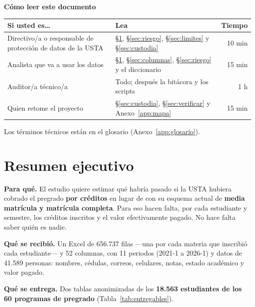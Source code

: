 \documentclass[11pt,a4paper,twoside,twocolumn]{article}
\newcommand{\cab}[1]{\textcolor{ustaAzul}{\textbf{#1}}}
\begin{document}
\begin{nota}
{\normalsize\bfseries\color{ustaAzul} Cómo leer este documento}\par\smallskip
\footnotesize
\setlength{\tabcolsep}{3pt}
\begin{tabularx}{\linewidth}{@{}L P{2.3cm} r@{}}
\toprule
\cab{Si usted es\ldots} & \cab{Lea} & \cab{Tiempo} \\
\midrule
Directivo/a o responsable de protección de datos de la USTA & §\ref{sec:resumen}, §\ref{sec:riesgo}, §\ref{sec:limites} y §\ref{sec:custodia} & 10 min \\
Analista que va a usar los datos & §\ref{sec:resumen}, §\ref{sec:columnas}, §\ref{sec:riesgo} y el diccionario & 15 min \\
Auditor/a técnico/a & Todo; después la bitácora y los scripts & 1 h \\
Quien retome el proyecto & §\ref{sec:custodia}, §\ref{sec:verificar} y Anexo~\ref{app:mapa} & 15 min \\
\bottomrule
\end{tabularx}
\par\smallskip
Los términos técnicos están en el glosario (Anexo~\ref{app:glosario}).
\end{nota}

\section{Resumen ejecutivo}\label{sec:resumen}

\textbf{Para qué.} El estudio quiere estimar qué habría pasado si la USTA hubiera cobrado el
pregrado \textbf{por créditos} en lugar de con su esquema actual de \textbf{media matrícula y
matrícula completa}. Para eso hacen falta, por cada estudiante y semestre, los créditos
inscritos y el valor efectivamente pagado. No hace falta saber quién es nadie.

\textbf{Qué se recibió.} Un Excel de 656.737 filas ---una por cada materia que inscribió cada
estudiante--- y 52 columnas, con 11 periodos (2021-1 a 2026-1) y datos de 41.589 personas:
nombres, cédulas, correos, celulares, notas, estado académico y valor pagado.

\textbf{Qué se entrega.} Dos tablas anonimizadas de los \textbf{18.563 estudiantes de los 60
programas de pregrado} (Tabla~\ref{tab:entregables}).
\end{document}
